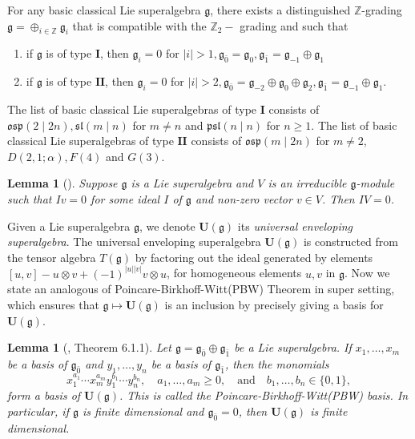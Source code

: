 \documentclass[11pt]{amsart}
\theoremstyle{plain}
\newtheorem{lemma}[thm]{Lemma}
\theoremstyle{definition}
\newcommand{\Z}{\mathbb{Z}}
\newcommand{\g}{\mathfrak{g}}
\begin{document}
For any basic classical Lie superalgebra $\g$, there exists a distinguished ${\Z}$-grading $\g=\oplus_{i\in{\Z}}\g_i$ that is compatible with the ${\Z}_2-$ grading and such that \cite{BCM19}
\begin{enumerate}[label=(\alph*)]
\item if $\g$ is of type $\textbf{I}$, then $\g_i=0$ for $|i|>1, {\g_{\bar 0}}=\g_0, {\g_{\bar1 }}=\g_{-1}\oplus \g_1$
\item if $\g$ is of type $\textbf{II}$, then $\g_i=0$ for $|i|>2, \g_{\bar{0}}=\g_{-2}\oplus\g_0\oplus\g_{2}, \g_{\bar{1}}=\g_{-1}\oplus\g_1$.
\end{enumerate}

The list of basic classical Lie superalgebras of type $\textbf{I}$ consists of $\mathfrak{osp}(2 \mid 2n), \mathfrak{sl}(m \mid n)$  for $m \neq n$ and $\mathfrak{psl}(n \mid n)$ for $n \geq 1.$
  The list of basic classical Lie superalgebras of type $\textbf{II}$ consists of $\mathfrak{osp}(m \mid 2n)$ for $m \neq 2$, $ D(2,1; \alpha), F(4)$ and $G(3)$.
\begin{lemma} [\cite{Sav14}]
Suppose $\g$ is a Lie superalgebra and $V$ is an irreducible $\g$-module such that $Iv=0$ for some ideal $I$ of $\g$ and non-zero vector $v\in V$. Then $IV=0$.
\end{lemma}
Given a Lie superalgebra $\g$, we denote $\mathbf{U}(\g)$ \label{pg:1} its {\em universal enveloping superalgebra}. The universal enveloping superalgebra $\mathbf{U}(\g)$ is constructed from the tensor algebra $T(\g)$ by factoring out  the ideal generated by elements $[u, v] - u\otimes v + (-1)^{|u||v|} v\otimes u$, for homogeneous elements $u, v$ in $\g$. Now we state an analogous of Poincare-Birkhoff-Witt(PBW) Theorem in super setting, which ensures that $\g \mapsto \mathbf{U}(\g)$ is an inclusion by precisely giving a basis for $\mathbf{U}(\g)$.

\begin{lemma}[\cite{Mus12}, Theorem 6.1.1] \label{lem:0}
Let $\g = \g_{\bar0} \oplus \g_{\bar1}$ be a Lie superalgebra. If $x_1, \ldots, x_m$ be a basis of $\g_{\bar0}$ and $y_1, \ldots, y_n$ be a basis of $\g_{\bar1}$, then the monomials
\[x_1^{a_1}\cdots x_m^{a_m} y_1^{b_1}\cdots y_n^{b_n}, \quad a_1, \ldots, a_m \geq 0, \quad \mbox{and}\quad b_1, \ldots, b_n \in \{0, 1\},\]
form a basis of $\mathbf{U}(\g)$. This is called the Poincare-Birkhoff-Witt(PBW) basis. In particular, if $\g$ is finite dimensional and $\g_{\bar 0} = 0$, then $\mathbf{U}(\g)$ is finite dimensional.
\end{lemma}
\end{document}
